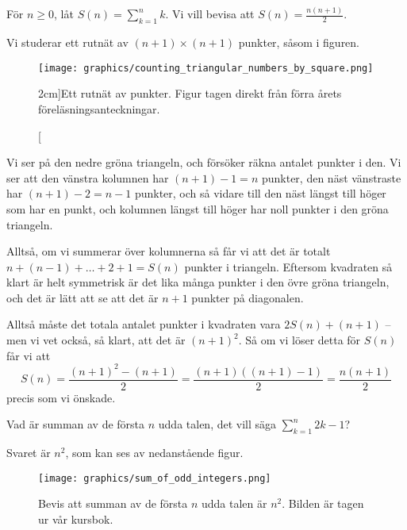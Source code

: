\documentclass[nobib]{tufte-handout}
\begin{document}
\begin{example}\label{example_triangular_numbers}
  För $n\geq 0$, låt $S(n) = \sum_{k=1}^n k$. Vi vill bevisa att $S(n) = \frac{n(n+1)}{2}$.

  Vi studerar ett rutnät av $(n+1)\times(n+1)$ punkter, såsom i figuren.

  \begin{figure}
    \texttt{[image: graphics/counting\_triangular\_numbers\_by\_square.png]}
    \caption[][2cm]{Ett rutnät av punkter. Figur tagen direkt från förra årets föreläsningsanteckningar.}
  \end{figure}
  
  Vi ser på den nedre gröna triangeln, och försöker räkna antalet punkter i den. Vi ser att den vänstra kolumnen har $(n+1)-1 = n$ punkter, den näst vänstraste har $(n+1)-2=n-1$ punkter, och så vidare till den näst längst till höger som har en punkt, och kolumnen längst till höger har noll punkter i den gröna triangeln.

  Alltså, om vi summerar över kolumnerna så får vi att det är totalt $n + (n-1) + \ldots + 2 + 1 = S(n)$ punkter i triangeln. Eftersom kvadraten så klart är helt symmetrisk är det lika många punkter i den övre gröna triangeln, och det är lätt att se att det är $n+1$ punkter på diagonalen.

  Alltså måste det totala antalet punkter i kvadraten vara $2S(n) + (n+1)$ -- men vi vet också, så klart, att det är $(n+1)^2$. Så om vi löser detta för $S(n)$ får vi att
    $$S(n) = \frac{(n+1)^2 - (n+1)}{2} = \frac{(n+1)((n+1)-1)}{2} = \frac{n(n+1)}{2}$$
  precis som vi önskade.
\end{example}

\begin{example}
  Vad är summan av de första $n$ udda talen, det vill säga $\sum_{k=1}^n 2k-1$?

  Svaret är $n^2$, som kan ses av nedanstående figur.
  \begin{figure}[h]
    \centering
    \texttt{[image: graphics/sum\_of\_odd\_integers.png]}
    \caption{Bevis att summan av de första $n$ udda talen är $n^2$. Bilden är tagen ur vår kursbok.}
  \end{figure}
\end{example}
\end{document}
